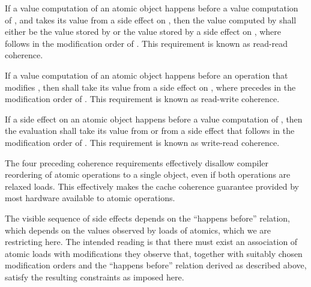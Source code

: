\pnum
If a
%
value computation  of an atomic object  happens before a
value computation  of , and  takes its value from a side
effect  on , then the value computed by  shall either be
the value stored by  or the value stored by a
%
side effect  on
, where  follows  in the modification order of .
\enternote This requirement is known as read-read coherence. \exitnote

\pnum
If a
%
value computation  of an atomic object  happens before an
operation  that modifies , then  shall take its value from a side
effect  on , where  precedes  in the
modification order of . \enternote This requirement is known as
read-write coherence. \exitnote

\pnum
If a
%
side effect  on an atomic object  happens before a value
computation  of , then the evaluation  shall take its
value from  or from a
%
side effect  that follows  in the
modification order of . \enternote This requirement is known as
write-read coherence. \exitnote

\pnum
\enternote The four preceding coherence requirements effectively disallow
compiler reordering of atomic operations to a single object, even if both
operations are relaxed loads. This effectively makes the cache coherence
guarantee provided by most hardware available to \Cpp atomic operations.
\exitnote

\pnum
\enternote The visible sequence of
%
side effects depends on the ``happens
before'' relation, which depends on the values observed by loads of atomics,
which we are restricting here. The intended reading is that there must exist an
association of atomic loads with modifications they observe that, together with
suitably chosen modification orders and the ``happens before'' relation derived
as described above, satisfy the resulting constraints as imposed here. \exitnote

